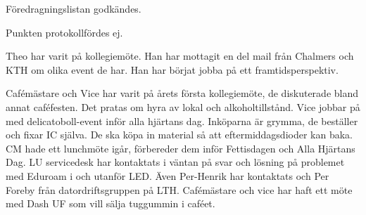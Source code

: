 \documentclass[10pt]{article}
\begin{document}
\begin{paragrafer}

Föredragningslistan godkändes.


\begin{fyllnadsval} %



\end{fyllnadsval}

\begin{paragrafer}

Punkten protokollfördes ej.



Theo har varit på kollegiemöte. Han har mottagit en del mail från Chalmers och KTH om olika event de har. Han har börjat jobba på ett framtidsperspektiv.

Cafémästare och Vice har varit på årets första kollegiemöte, de diskuterade bland annat caféfesten. Det pratas om hyra av lokal och alkoholtillstånd.
Vice jobbar på med delicatoboll-event inför alla hjärtans dag. 
Inköparna är grymma, de beställer och fixar IC själva. De ska köpa in material så att eftermiddagsdioder kan baka.
CM hade ett lunchmöte igår, förbereder dem inför Fettisdagen och Alla Hjärtans Dag. 
LU servicedesk har kontaktats i väntan på svar och lösning på problemet med Eduroam i och utanför LED. Även Per-Henrik har kontaktats och Per Foreby från datordriftsgruppen på LTH.
Cafémästare och vice har haft ett möte med Dash UF som vill sälja tuggummin i caféet.


\end{paragrafer}
\end{paragrafer}
\end{document}
